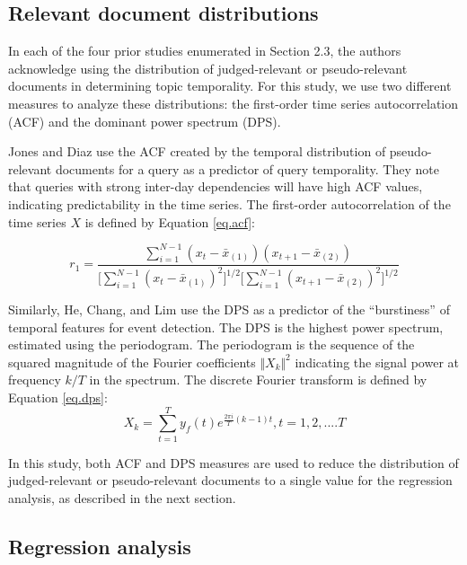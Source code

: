 \documentclass{sig-alternate}
\begin{document}
\subsection{Relevant document distributions}

In each of the four prior studies enumerated in Section 2.3, the authors acknowledge using the distribution of judged-relevant or pseudo-relevant documents in determining topic temporality. For this study, we use two different measures to analyze these distributions: the first-order time series autocorrelation (ACF) and the dominant power spectrum (DPS).

Jones and Diaz \cite{Jones2007} use the ACF created by the temporal distribution of pseudo-relevant documents for a query as a predictor of query temporality. They note that queries with strong inter-day dependencies will have high ACF values, indicating predictability in the time series. The first-order autocorrelation of the time series $X$ is defined by Equation \ref{eq.acf}:

\begin{equation}
r_1 = \dfrac{\sum_{i=1}^{N-1} (x_t - \bar{x}_{(1)})(x_{t+1} - \bar{x}_{(2)})}{ \big [ \sum_{i=1}^{N-1}  (x_t - \bar{x}_{(1)})^2 \big ] ^{1/2} \big [\sum_{i=1}^{N-1} (x_{t+1} - \bar{x}_{(2)})^2 \big ]^{1/2}}
\label{eq.acf}
\end{equation}

Similarly, He, Chang, and Lim \cite{He2007} use the DPS as a predictor of the ``burstiness'' of temporal features for event detection. The DPS is the highest power spectrum, estimated using the periodogram. The periodogram is the sequence of the squared magnitude of the Fourier coefficients $\Vert X_k \Vert^2$ indicating the signal power at frequency $k/T$ in the spectrum.  The discrete Fourier transform is defined by Equation \ref{eq.dps}:
\begin{equation}
X_k = \sum_{t=1}^T y_f(t)e^{\frac{2\pi i}{T}(k - 1)t}, t=1,2,....T
\label{eq.dps}
\end{equation}

In this study, both ACF and DPS measures are used to reduce the distribution of judged-relevant or pseudo-relevant documents to a single value for the regression analysis, as described in the next section.

\subsection{Regression analysis}
\end{document}
